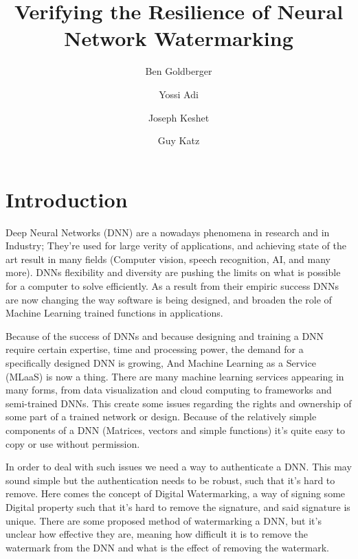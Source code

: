 \documentclass[a4paper]{llncs}
\begin{document}
\title{Verifying the Resilience of Neural Network Watermarking}

\author{
  Ben Goldberger \and
  Yossi Adi \and
  Joseph Keshet \and
  Guy Katz 
}


\maketitle

\section{Introduction}


Deep Neural Networks (DNN) are a nowadays phenomena in research and in Industry; They're used for large verity of applications, and achieving state of the art result in many fields (Computer vision, speech recognition, AI, and many more). DNNs flexibility and diversity are pushing the limits on what is possible for a computer to solve efficiently. As a result from their empiric success DNNs are now changing the way software is being designed, and broaden the role of Machine Learning trained functions in applications.

Because of the success of DNNs and because designing and training a DNN require certain expertise, time and processing power, the demand for a specifically designed DNN is growing, And Machine Learning as a Service (MLaaS) is now a thing. There are many machine learning services appearing in many forms, from data visualization and cloud computing to frameworks and semi-trained DNNs. This create some issues regarding the rights and ownership of some part of a trained network or design. Because of the relatively simple components of a DNN (Matrices, vectors and simple functions) it's quite easy to copy or use without permission.

In order to deal with such issues we need a way to authenticate a DNN. This may sound simple but the authentication needs to be robust, such that it's hard to remove. Here comes the concept of Digital Watermarking, a way of signing some Digital property such that it's hard to remove the signature, and said signature is unique. There are some proposed method of watermarking a DNN, but it's unclear how effective they are, meaning how difficult it is to remove the watermark from the DNN and what is the effect of removing the watermark.
\end{document}
